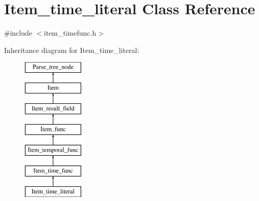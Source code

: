\hypertarget{classItem__time__literal}{}\section{Item\+\_\+time\+\_\+literal Class Reference}
\label{classItem__time__literal}


{\ttfamily \#include $<$item\+\_\+timefunc.\+h$>$}

Inheritance diagram for Item\+\_\+time\+\_\+literal\+:\begin{figure}[H]
\begin{center}
\leavevmode
\includegraphics[height=7.000000cm]{classItem__time__literal}
\end{center}
\end{figure}
